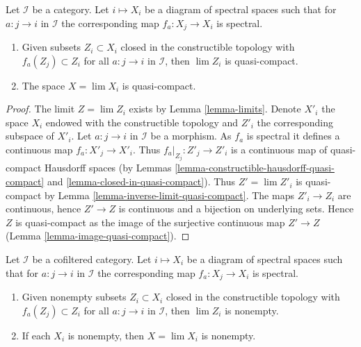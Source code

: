\begin{lemma}
\label{lemma-inverse-limit-spectral-spaces-quasi-compact}
Let $\mathcal{I}$ be a category. Let $i \mapsto X_i$ be a diagram
of spectral spaces such that for $a : j \to i$ in $\mathcal{I}$
the corresponding map $f_a : X_j \to X_i$ is spectral.
\begin{enumerate}
\item Given subsets $Z_i \subset X_i$ closed in the constructible
topology with $f_a(Z_j) \subset Z_i$ for all $a : j \to i$ in $\mathcal{I}$,
then $\lim Z_i$ is quasi-compact.
\item The space $X = \lim X_i$ is quasi-compact.
\end{enumerate}
\end{lemma}

\begin{proof}
The limit $Z = \lim Z_i$ exists by Lemma \ref{lemma-limits}.
Denote $X'_i$ the space $X_i$ endowed with the constructible topology
and $Z'_i$ the corresponding subspace of $X'_i$.
Let $a : j \to i$ in $\mathcal{I}$ be a morphism. As $f_a$ is spectral
it defines a continuous map $f_a : X'_j \to X'_i$. Thus
$f_a|_{Z_j} : Z'_j \to Z'_i$ is a continuous map of quasi-compact
Hausdorff spaces (by
Lemmas \ref{lemma-constructible-hausdorff-quasi-compact} and
\ref{lemma-closed-in-quasi-compact}).
Thus $Z' = \lim Z'_i$ is quasi-compact by
Lemma \ref{lemma-inverse-limit-quasi-compact}.
The maps $Z'_i \to Z_i$ are continuous, hence $Z' \to Z$
is continuous and a bijection on underlying sets. Hence $Z$
is quasi-compact as the image of the surjective continuous map $Z' \to Z$
(Lemma \ref{lemma-image-quasi-compact}).
\end{proof}

\begin{lemma}
\label{lemma-inverse-limit-spectral-spaces-nonempty}
Let $\mathcal{I}$ be a cofiltered category. Let $i \mapsto X_i$ be a diagram
of spectral spaces such that for $a : j \to i$ in $\mathcal{I}$
the corresponding map $f_a : X_j \to X_i$ is spectral.
\begin{enumerate}
\item Given nonempty subsets $Z_i \subset X_i$ closed in the constructible
topology with $f_a(Z_j) \subset Z_i$ for all $a : j \to i$ in $\mathcal{I}$,
then $\lim Z_i$ is nonempty.
\item If each $X_i$ is nonempty, then $X = \lim X_i$ is nonempty.
\end{enumerate}
\end{lemma}

